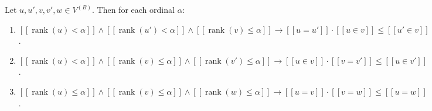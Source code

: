 Let $u, u', v, v', w \in V^{(B)}$. Then for each ordinal $\alpha$:
\begin{enumerate}
\item $[\![\operatorname{rank}(u) < \alpha]\!] \wedge [\![\operatorname{rank}(u') < \alpha]\!] \wedge [\![\operatorname{rank}(v) \leq \alpha]\!] \rightarrow [\![u = u']\!] \cdot [\![u \in v]\!] \leq [\![u' \in v]\!]$.
\item $[\![\operatorname{rank}(u) < \alpha]\!] \wedge [\![\operatorname{rank}(v) \leq \alpha]\!] \wedge [\![\operatorname{rank}(v') \leq \alpha]\!] \rightarrow [\![u \in v]\!] \cdot [\![v = v']\!] \leq [\![u \in v']\!]$.
\item $[\![\operatorname{rank}(u) \leq \alpha]\!] \wedge [\![\operatorname{rank}(v) \leq \alpha]\!] \wedge [\![\operatorname{rank}(w) \leq \alpha]\!] \rightarrow [\![u = v]\!] \cdot [\![v = w]\!] \leq [\![u = w]\!]$.
\end{enumerate}
